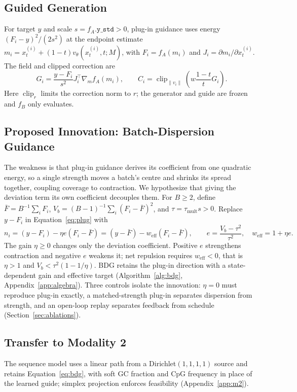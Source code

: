 \documentclass{article}
\newcommand{\Fbar}{\bar F}
\newcommand{\Vb}{V_b}
\newcommand{\weff}{w_{\mathrm{eff}}}
\begin{document}
\subsection{Guided Generation}\label{sec:guidance}
For target $y$ and scale $s=f_A.\texttt{y\_std}>0$, plug-in guidance uses energy $(F_i-y)^2/(2s^2)$ at the endpoint estimate $m_i=x_t^{(i)}+(1-t)v_\theta(x_t^{(i)},t;M)$, with $F_i=f_A(m_i)$ and $J_i=\partial m_i/\partial x_t^{(i)}$. The field and clipped correction are
\begin{equation}
G_i=\frac{y-F_i}{s^2}J_i^\top\nabla_m f_A(m_i),\qquad
C_i=\operatorname{clip}_{\|v_i\|}\!\left(w\frac{1-t}{t}G_i\right).
\label{eq:plug}
\end{equation}
Here $\operatorname{clip}_r$ limits the correction norm to $r$; the generator and guide are frozen and $f_B$ only evaluates.

\subsection{Proposed Innovation: Batch-Dispersion Guidance}\label{sec:bdg}
The weakness is that plug-in guidance derives its coefficient from one quadratic energy, so a single strength moves a batch's centre and shrinks its spread together, coupling coverage to contraction. We hypothesize that giving the deviation term its own coefficient decouples them. For $B\ge2$, define $\Fbar=B^{-1}\sum_iF_i$, $\Vb=(B-1)^{-1}\sum_i(F_i-\Fbar)^2$, and $\tau=\tau_{\mathrm{mult}}s>0$. Replace $y-F_i$ in Equation~\eqref{eq:plug} with
\begin{equation}
n_i=(y-F_i)-\eta e(F_i-\Fbar)=(y-\Fbar)-\weff(F_i-\Fbar),\qquad
e=\frac{\Vb-\tau^2}{\tau^2},\quad \weff=1+\eta e.
\label{eq:bdg}
\end{equation}
The gain $\eta\ge0$ changes only the deviation coefficient. Positive $e$ strengthens contraction and negative $e$ weakens it; net repulsion requires $\weff<0$, that is $\eta>1$ and $\Vb<\tau^2(1-1/\eta)$. BDG retains the plug-in direction with a state-dependent gain and effective target (Algorithm~\ref{alg:bdg}, Appendix~\ref{app:algebra}). Three controls isolate the innovation: $\eta=0$ must reproduce plug-in exactly, a matched-strength plug-in separates dispersion from strength, and an open-loop replay separates feedback from schedule (Section~\ref{sec:ablations}).

\subsection{Transfer to Modality 2}\label{sec:transfer}
The sequence model uses a linear path from a Dirichlet$(1,1,1,1)$ source and retains Equation~\eqref{eq:bdg}, with soft GC fraction and CpG frequency in place of the learned guide; simplex projection enforces feasibility (Appendix~\ref{app:m2}).
\end{document}
